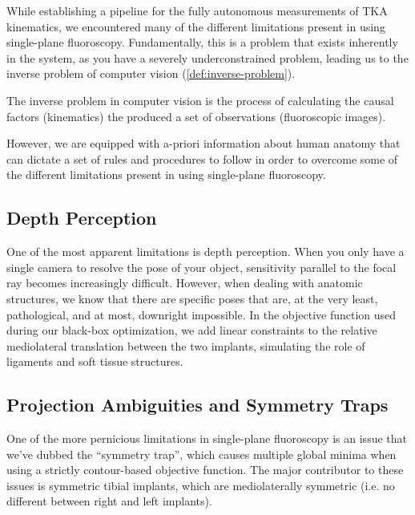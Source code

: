 While establishing a pipeline for the fully autonomous measurements of TKA kinematics, we encountered many of the different limitations present in using single-plane fluoroscopy. Fundamentally, this is a problem that exists inherently in the system, as you have a severely underconstrained problem, leading us to the inverse problem of computer vision (\cref{def:inverse-problem}).

\begin{mdframed}
    \begin{definition}
        The inverse problem in computer vision is the process of calculating the causal factors (kinematics) the produced a set of observations (fluoroscopic images).
        \label{def:inverse-problem}
    \end{definition}
\end{mdframed}

However, we are equipped with a-priori information about human anatomy that can dictate a set of rules and procedures to follow in order to overcome some of the different limitations present in using single-plane fluoroscopy.

\subsection{Depth Perception}
One of the most apparent limitations is depth perception. When you only have a single camera to resolve the pose of your object, sensitivity parallel to the focal ray becomes increasingly difficult. However, when dealing with anatomic structures, we know that there are specific poses that are, at the very least, pathological, and at most, downright impossible. In the objective function used during our black-box optimization, we add linear constraints to the relative mediolateral translation between the two implants, simulating the role of ligaments and soft tissue structures. 

\subsection{Projection Ambiguities and Symmetry Traps}

One of the more pernicious limitations in single-plane fluoroscopy is an issue that we've dubbed the ``symmetry trap'', which causes multiple global minima when using a strictly contour-based objective function. The major contributor to these issues is symmetric tibial implants, which are mediolaterally symmetric (i.e. no different between right and left implants).

